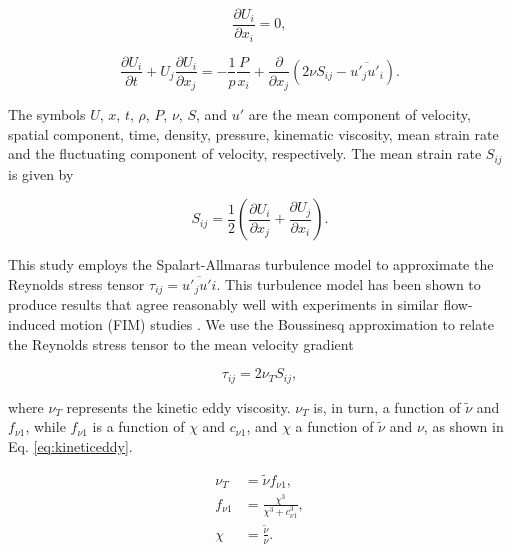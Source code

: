 \documentclass[a4paper,fleqn]{cas-sc}
\begin{document}
\begin{equation}
  \frac{\partial U_{i}}{\partial x_{i}}=0,
  \label{eq:continuity}
\end{equation}

\begin{equation}
  \frac{\partial U_{i}}{\partial t}+U_{j}\frac{\partial U_{i}}{\partial x_{j}} = -\frac{1}{p}\frac{P}{x_{i}}+\frac{\partial}{\partial x_{j}} \left( 2\nu S_{ij}-\overline{u'_{j}u'_{i}} \right).
  \label{eq:navier-stokes}
\end{equation}

The symbols $U$, $x$, $t$, $\rho$, $P$, $\nu$, $S$, and $u'$ are the mean component of velocity, spatial component, time, density, pressure, kinematic viscosity, mean strain rate and the fluctuating component of velocity, respectively. The mean strain rate $S_{ij}$ is given by

\begin{equation}
  S_{ij} = \frac{1}{2} \left( \frac{\partial U_{i}}{\partial x_{j}} + \frac{\partial U_{j}}{\partial x_{i}} \right).
  \label{eq:sij}
\end{equation}

This study employs the Spalart-Allmaras turbulence model to approximate the Reynolds stress tensor $\tau_{ij} = \overline{u'_{j}u'{i}}$. This turbulence model has been shown to produce results that agree reasonably well with experiments in similar flow-induced motion (FIM) studies \citep{Ding2015a,Ding2015b}. We use the Boussinesq approximation to relate the Reynolds stress tensor to the mean velocity gradient

\begin{equation}
  \tau_{ij} = 2 \nu_{T}S_{ij},
  \label{eq:tauij}
\end{equation}

\noindent where $\nu_{T}$ represents the kinetic eddy viscosity. $\nu_{T}$ is, in turn, a function of $\tilde{\nu}$ and $f_{\nu 1}$, while $f_{\nu 1}$ is a function of $\chi$ and $c_{\nu 1}$, and $\chi$ a function of $\tilde{\nu}$ and $\nu$, as shown in Eq. \ref{eq:kineticeddy}.

\begin{subequations}
  \label{eq:kineticeddy}
  \begin{align}
    \nu_{T}   & = \tilde{\nu} f_{\nu 1}, \label{eq:kineticeddyA}\\
    f_{\nu 1} & = \frac{\chi^{3}}{\chi^{3}+c^{3}_{\nu 1}}, \label{eq:kineticeddyB}\\
    \chi      & = \frac{\tilde{\nu}}{\nu}. \label{eq:kineticeddyC}
\end{align}
\end{subequations}
\end{document}
